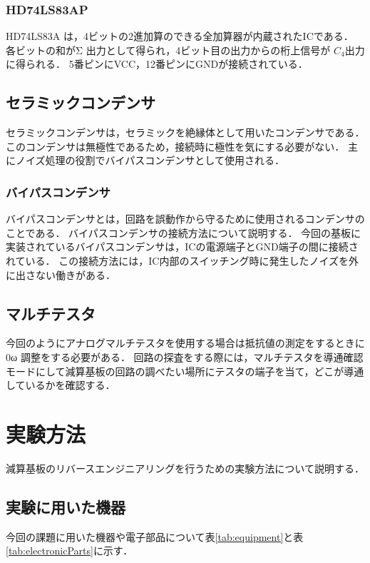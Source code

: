 \documentclass[a4paper,11pt,dvipdfmx]{jsarticle}
\begin{document}
\subsubsection{HD74LS83AP}
HD74LS83A は，4ビットの2進加算のできる全加算器が内蔵されたICである．
各ビットの和がΣ 出力として得られ，4ビット目の出力からの桁上信号が $C_4$出力に得られる．
5番ピンにVCC，12番ピンにGNDが接続されている．

\subsection{セラミックコンデンサ} \label{subsec:ceramicCapacitor}
セラミックコンデンサは，セラミックを絶縁体として用いたコンデンサである．
このコンデンサは無極性であるため，接続時に極性を気にする必要がない．
主にノイズ処理の役割でバイパスコンデンサとして使用される．


\subsubsection{バイパスコンデンサ} \label{subsec:bypassCapacitor}
バイパスコンデンサとは，回路を誤動作から守るために使用されるコンデンサのことである\cite{digital}．
バイパスコンデンサの接続方法について説明する．
今回の基板に実装されているバイパスコンデンサは，ICの電源端子とGND端子の間に接続されている．
この接続方法には，IC内部のスイッチング時に発生したノイズを外に出さない働きがある\cite{digital}．

\subsection{マルチテスタ}
今回のようにアナログマルチテスタを使用する場合は抵抗値の測定をするときに0ω 調整をする必要がある．
回路の探査をする際には，マルチテスタを導通確認モードにして減算基板の回路の調べたい場所にテスタの端子を当て，どこが導通しているかを確認する．


\section{実験方法} \label{sec:method}
減算基板のリバースエンジニアリングを行うための実験方法について説明する．

\subsection{実験に用いた機器} \label{subsec:equipment}
今回の課題に用いた機器や電子部品について表\ref{tab:equipment}と表\ref{tab:electronicParts}に示す．
\end{document}
